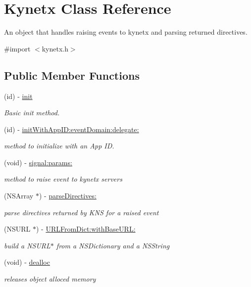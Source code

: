 \hypertarget{interface_kynetx}{
\section{Kynetx Class Reference}
\label{interface_kynetx}
}


An object that handles raising events to kynetx and parsing returned directives.  




{\ttfamily \#import $<$kynetx.h$>$}

\subsection*{Public Member Functions}
\begin{DoxyCompactItemize}
\item 
(id) -\/ \hyperlink{interface_kynetx_a08fe0edc1c1677b0b852f506c95d74cc}{init}
\begin{DoxyCompactList}\small\item\em Basic init method. \item\end{DoxyCompactList}\item 
(id) -\/ \hyperlink{interface_kynetx_ae1e26d7f64b9d1ade67a4f3337534092}{initWithAppID:eventDomain:delegate:}
\begin{DoxyCompactList}\small\item\em method to initialize with an App ID. \item\end{DoxyCompactList}\item 
(void) -\/ \hyperlink{interface_kynetx_a5248c376dc9cdc1c15d263e41804b90c}{signal:params:}
\begin{DoxyCompactList}\small\item\em method to raise event to kynetx servers \item\end{DoxyCompactList}\item 
(NSArray $\ast$) -\/ \hyperlink{interface_kynetx_a917fca6c0151b1a1eb7ca8d0202a9010}{parseDirectives:}
\begin{DoxyCompactList}\small\item\em parse directives returned by KNS for a raised event \item\end{DoxyCompactList}\item 
(NSURL $\ast$) -\/ \hyperlink{interface_kynetx_af273f986eaaf3565df7ad4a99046e176}{URLFromDict:withBaseURL:}
\begin{DoxyCompactList}\small\item\em build a NSURL$\ast$ from a NSDictionary and a NSString \item\end{DoxyCompactList}\item 
(void) -\/ \hyperlink{interface_kynetx_a5863d21ba892b54b54f91db0525dfeed}{dealloc}
\begin{DoxyCompactList}\small\item\em releases object alloced memory \item\end{DoxyCompactList}\end{DoxyCompactItemize}
